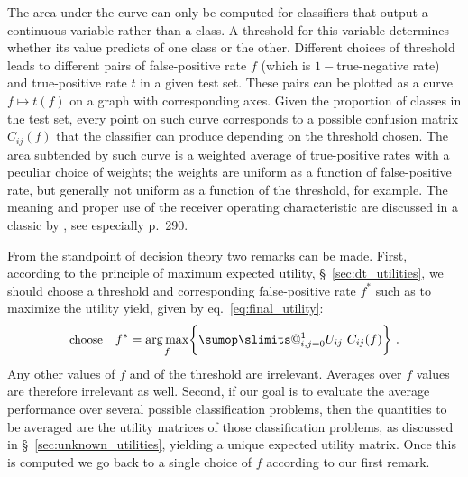\documentclass[\ifafour a4paper,12pt,\else a5paper,10pt,\fi%
onecolumn,oneside,article,%
british%
]{memoir}
\makeatletter
\theoremstyle{remark}
\theoremstyle{innote}
\def\sum{\DOTSI\sumop\slimits@}
\DeclarePairedDelimiter\set{\{}{\}} %
\renewcommand*{\|}[1][]{\nonscript\:#1\vert\nonscript\:\mathopen{}}
\newcommand*{\sect}{\S}%
\newcommand*{\eqn}{eq.}%
\DeclareMathOperator*{\argmax}{arg\,max}
\makeatother
\begin{document}
The area under the curve can only be computed for classifiers that output a continuous variable rather than a class. A threshold for this variable determines whether its value predicts of one class or the other. Different choices of threshold leads to different pairs of false-positive rate $f$ (which is $1-{}$true-negative rate) and true-positive rate $t$ in a given test set. These pairs can be plotted as a curve $f \mapsto t(f)$ on a graph with corresponding axes. Given the proportion of classes in the test set, every point on such curve corresponds to a possible confusion matrix $C_{ij}(f)$ that the classifier can produce depending on the threshold chosen. The area subtended by such curve is a weighted average of true-positive rates with a peculiar choice of weights; the weights are uniform as a function of false-positive rate, but generally not uniform as a function of the threshold, for example. The meaning and proper use of the receiver operating characteristic are discussed in a classic by \cites{metz1978}, see especially p.~290.


\medskip

From the standpoint of decision theory two remarks can be made\autocites[similar points are made by][]{bakeretal2001,loboetal2008}. First, according to the principle of maximum expected utility, \sect~\ref{sec:dt_utilities}, we should choose a threshold and corresponding false-positive rate $f^{*}$ such as to maximize the utility yield, given by \eqn~\eqref{eq:final_utility}:
\begin{equation}
  \label{eq:threshold_auc_maxutility}
  \text{\small choose}\quad
  f^{*} = \argmax_{f}\set[\bigg]{\sum_{i,j=0}^{1} U_{ij}\ C_{ij}(f)} \ .
\end{equation}
Any other values of $f$ and of the threshold are irrelevant. Averages over $f$ values are therefore irrelevant as well. Second, if our goal is to evaluate the average performance over several possible classification problems, then the quantities to be averaged are the utility matrices of those classification problems, as discussed in \sect~\ref{sec:unknown_utilities}, yielding a unique expected utility matrix. Once this is computed we go back to a single choice of $f$ according to our first remark.
\end{document}

